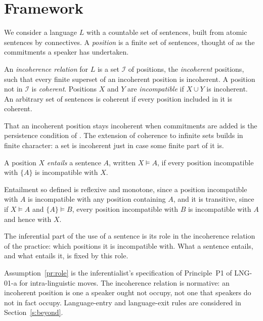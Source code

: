 \documentclass{situationist-preprint}
\begin{document}
\section{Framework}\label{s:frame}

We consider a language $L$ with a countable set of sentences, built from atomic sentences by connectives. A \emph{position} is a finite set of sentences, thought of as the commitments a speaker has undertaken.

\begin{definition}[Incoherence]\label{d:inc}
An \emph{incoherence relation} for $L$ is a set $\mathcal{I}$ of positions, the \emph{incoherent} positions, such that every finite superset of an incoherent position is incoherent. A position not in $\mathcal{I}$ is \emph{coherent}. Positions $X$ and $Y$ are \emph{incompatible} if $X \cup Y$ is incoherent. An arbitrary set of sentences is coherent if every position included in it is coherent.
\end{definition}

That an incoherent position stays incoherent when commitments are added is the persistence condition of \citet[ch.~5]{Brandom2008}. The extension of coherence to infinite sets builds in finite character: a set is incoherent just in case some finite part of it is.

\begin{definition}[Entailment]\label{d:ent}
A position $X$ \emph{entails} a sentence $A$, written $X \models A$, if every position incompatible with $\{A\}$ is incompatible with $X$.
\end{definition}

Entailment so defined is reflexive and monotone, since a position incompatible with $A$ is incompatible with any position containing $A$, and it is transitive, since if $X \models A$ and $\{A\} \models B$, every position incompatible with $B$ is incompatible with $A$ and hence with $X$.

\begin{assumption}\label{pr:role}
The inferential part of the use of a sentence is its role in the incoherence relation of the practice: which positions it is incompatible with. What a sentence entails, and what entails it, is fixed by this role.
\end{assumption}

Assumption~\ref{pr:role} is the inferentialist's specification of Principle~P1 of LNG-01-a for intra-linguistic moves. The incoherence relation is normative: an incoherent position is one a speaker ought not occupy, not one that speakers do not in fact occupy. Language-entry and language-exit rules are considered in Section~\ref{s:beyond}.
\end{document}
